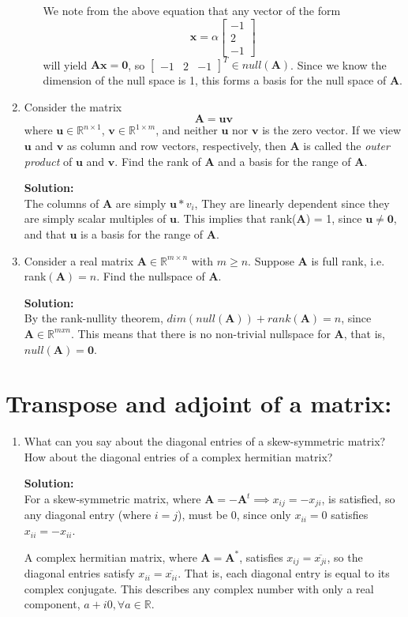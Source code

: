 \documentclass[]{article}
\newcommand{\R}{\mathbb{R}}				%
\newcommand{\bbm}{\begin{bmatrix}}		%
\newcommand{\ebm}{\end{bmatrix}}		%
\newcommand{\A}{\bm{A}}					%
\newcommand{\solution}{\vskip 0.5cm \textbf{\large Solution:} \\}
\begin{document}
\begin{enumerate}[resume]
\begin{enumerate}
        We note from the above equation that any vector of the form
        \[
        \bm{x} = \alpha \bbm -1 \\ 2 \\ -1 \ebm
        \]
        will yield $\bm{Ax} = \bm{0}$, so $\bbm -1 & 2 & -1 \ebm^T \in
        null(\A)$. Since we know the dimension of the null space
        is 1, this forms a basis for the null space of $\A$.
        
	  \end{enumerate}

	\item Consider the matrix
	  \[
	  \A = \bm{uv}
	  \]
	  where $\bm{u}\in\R^{n\times 1}$, $\bm{v}\in\R^{1\times m}$, and
      neither $\bm{u}$ nor $\bm{v}$ is the zero vector. If we view
      $\bm{u}$ and $\bm{v}$ as column and row vectors, respectively,
      then $\A$ is called the \textit{outer product} of $\bm{u}$ and
      $\bm{v}$. Find the rank of $\A$ and a basis for the range of
      $\A$.

	  \solution The columns of $\A$ are simply $\bm{u} * v_i$, They
      are linearly dependent since they are simply scalar multiples of
      $\bm{u}$. This implies that rank($\A$) = 1, since $\bm{u} \neq
      \bm{0}$, and that $\bm{u}$ is a basis for the range of $\A$.



	\item Consider a real matrix $\A\in\R^{m\times n}$ with $m\geq n$. Suppose $\A$ is full rank, i.e. rank$(\A)=n$. Find the nullspace of $\A$.

	  \solution By the rank-nullity theorem, $dim(null(\A)) + rank(\A)
      = n$, since $\A \in \R^{mxn}$. This means that there is no
      non-trivial nullspace for $\A$, that is, $null(\A) =
      \bm{0}$.


    \end{enumerate}

    \section*{Transpose and adjoint of a matrix:}
    \begin{enumerate}[resume]
	\item What can you say about the diagonal entries of a skew-symmetric matrix? How about the diagonal entries of a complex hermitian matrix?

	  \solution For a skew-symmetric matrix, where $\A = -\A^t
      \implies x_{ij} = -x_{ji}$, is satisfied, so any diagonal entry
      (where $i = j$), must be 0, since only $x_{ii} = 0$ satisfies
      $x_{ii} = -x_{ii}$.

      A complex hermitian matrix, where $\A = \A^*$, satisfies $x_{ij}
      = \overline{x_{ji}}$, so the diagonal entries satisfy $x_{ii} =
      \overline{x_{ii}}$. That is, each diagonal entry is equal to its
      complex conjugate. This describes any complex number with only a
      real component, $a + i0, \forall a \in \R$.

    \end{enumerate}
\end{document}
